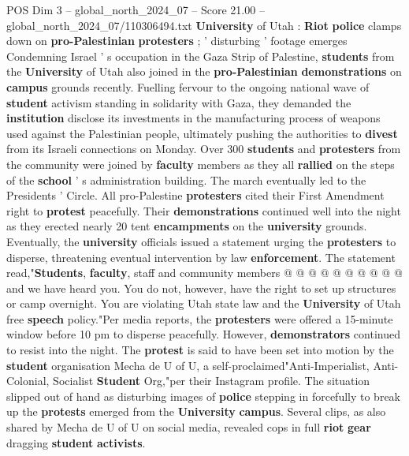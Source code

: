 \begin{textsample}{POS Dim 3 – global\_north\_2024\_07 – Score 21.00 – global\_north\_2024\_07/110306494.txt}  \label{ex:f3_pos_082}
\textbf{University} of Utah : \textbf{Riot} \textbf{police} clamps down on \textbf{pro-Palestinian} \textbf{protesters} ; ' disturbing ' footage emerges Condemning Israel ' s occupation in the Gaza Strip of Palestine, \textbf{students} from the \textbf{University} of Utah also joined in the \textbf{pro-Palestinian} \textbf{demonstrations} on \textbf{campus} grounds recently.
Fuelling fervour to the ongoing national wave of \textbf{student} activism standing in solidarity with Gaza, they demanded the \textbf{institution} disclose its investments in the manufacturing process of weapons used against the Palestinian people, ultimately pushing the authorities to \textbf{divest} from its Israeli connections on Monday.
Over 300 \textbf{students} and \textbf{protesters} from the community were joined by \textbf{faculty} members as they all \textbf{rallied} on the steps of the \textbf{school} ' s administration building.
The march eventually led to the Presidents ' Circle.
All pro-Palestine \textbf{protesters} cited their First Amendment right to \textbf{protest} peacefully.
Their \textbf{demonstrations} continued well into the night as they erected nearly 20 tent \textbf{encampments} on the \textbf{university} grounds.
Eventually, the \textbf{university} officials issued a statement urging the \textbf{protesters} to disperse, threatening eventual intervention by law \textbf{enforcement}.
The statement read,"\textbf{Students}, \textbf{faculty}, staff and community members @ @ @ @ @ @ @ @ @ @ and we have heard you.
You do not, however, have the right to set up structures or camp overnight.
You are violating Utah state law and the \textbf{University} of Utah free \textbf{speech} policy."Per media reports, the \textbf{protesters} were offered a 15-minute window before 10 pm to disperse peacefully.
However, \textbf{demonstrators} continued to resist into the night.
The \textbf{protest} is said to have been set into motion by the \textbf{student} organisation Mecha de U of U, a self-proclaimed"Anti-Imperialist, Anti-Colonial, Socialist \textbf{Student} Org,"per their Instagram profile.
The situation slipped out of hand as disturbing images of \textbf{police} stepping in forcefully to break up the \textbf{protests} emerged from the \textbf{University} \textbf{campus}.
Several clips, as also shared by Mecha de U of U on social media, revealed cops in full \textbf{riot} \textbf{gear} dragging \textbf{student} \textbf{activists}.

\end{textsample}

